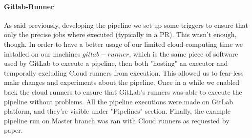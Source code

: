 \documentclass[a4paper,10pt]{scrartcl}
\begin{document}
\paragraph{Gitlab-Runner}

As said previously, developing the pipeline we set up some triggers to ensure that only the precise jobs where executed (typically in a PR). This wasn't enough, though. In order to have a better usage of our limited cloud computing time we installed on our machines $gitlab-runner$, which is the same piece of software used by GitLab to execute a pipeline, then both "hosting" an executor and temporally excluding Cloud runners from execution. This allowed us to fear-less make changes and experiments about the pipeline. Once in a while we enabled back the cloud runners to ensure that GitLab's runners was able to execute the pipeline without problems. All the pipeline executions were made on GitLab platform, and they're visible under "Pipelines" section. Finally, the example pipeline run on Master branch was ran with Cloud runners as requested by paper.
\end{document}
